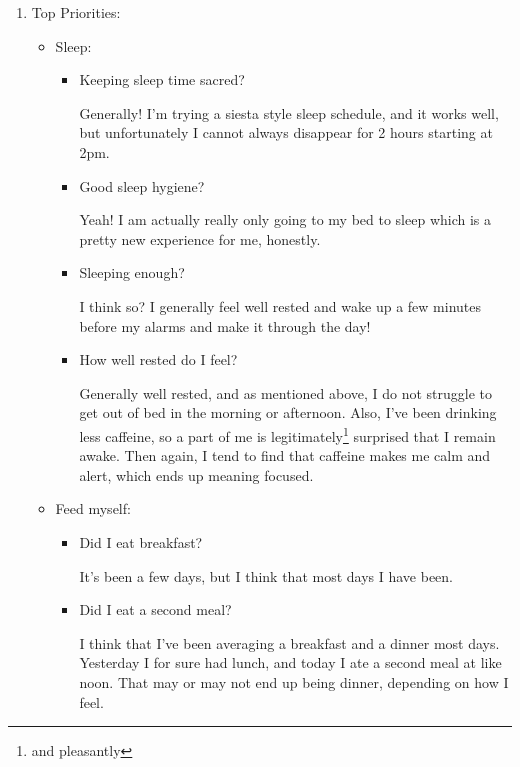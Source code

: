 \documentclass[12pt]{article}
\renewcommand{\,}{\textsuperscript{,}}
\begin{document}
\begin{enumerate}

\item Top Priorities:

\begin{itemize}

\item Sleep:

\begin{itemize}

\item Keeping sleep time sacred?

Generally! I'm trying a siesta style sleep schedule, and it works well, but unfortunately I cannot always disappear for 2 hours starting at 2pm.

\item Good sleep hygiene?

Yeah! I am actually really only going to my bed to sleep which is a pretty new experience for me, honestly.

\item Sleeping enough?

I think so? I generally feel well rested and wake up a few minutes before my alarms and make it through the day!

\item How well rested do I feel?

Generally well rested, and as mentioned above, I do not struggle to get out of bed in the morning or afternoon.  
Also, I've been drinking less caffeine, so a part of me is legitimately\footnote{and pleasantly} surprised that I remain awake.  
Then again, I tend to find that caffeine makes me calm and alert, which ends up meaning focused.

\end{itemize}

\item Feed myself:

\begin{itemize}

\item Did I eat breakfast?

It's been a few days, but I think that most days I have been.

\item Did I eat a second meal?

I think that I've been averaging a breakfast and a dinner most days. Yesterday I for sure had lunch, and today I ate a second meal at like noon.  
That may or may not end up being dinner, depending on how I feel.


\end{itemize}
\end{itemize}
\end{enumerate}
\end{document}
